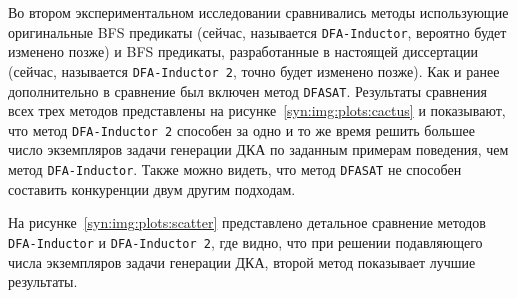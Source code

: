 \begin{table}[ht]
  \caption{Медианное время работы методов генерации ДКА по заданным примерам поведения с использованием BFS предикатов нарушения симметрии, DFS предикатов нарушения симметрии и метода \texttt{DFASAT} в секундах. Время работы методов было ограничено одним часом ($\text{TL} = 3600\,\, \text{секунд}$)}
  \centering
  \label{syn:tab:DFS-results}
\end{table}

Во втором экспериментальном исследовании сравнивались методы использующие оригинальные BFS предикаты (сейчас, называется \texttt{DFA-Inductor}, вероятно будет изменено позже) и BFS предикаты, разработанные в настоящей диссертации (сейчас, называется \texttt{DFA-Inductor~2}, точно будет изменено позже).
Как и ранее дополнительно в сравнение был включен метод \texttt{DFASAT}.
Результаты сравнения всех трех методов представлены на рисунке~\ref{syn:img:plots:cactus} и показывают, что метод \texttt{DFA-Inductor~2} способен за одно и то же время решить большее число экземпляров задачи генерации ДКА по заданным примерам поведения, чем метод \texttt{DFA-Inductor}.
Также можно видеть, что метод \texttt{DFASAT} не способен составить конкуренции двум другим подходам.

На рисунке~\ref{syn:img:plots:scatter} представлено детальное сравнение методов \texttt{DFA-Inductor} и \texttt{DFA-Inductor~2}, где видно, что при решении подавляющего числа экземпляров задачи генерации ДКА, второй метод показывает лучшие результаты.

